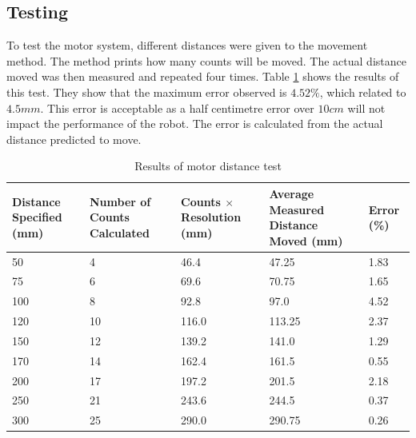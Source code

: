 \subsection{Testing}\label{Section:MotorTest}

To test the motor system, different distances were given to the movement method. The method prints how many counts will be moved. The actual distance moved was then measured and repeated four times. Table \ref{table:results:motor:distance} shows the results of this test. They show that the maximum error observed is $4.52\%$, which related to $4.5mm$. This error is acceptable as a half centimetre error over $10cm$ will not impact the performance of the robot. The error is calculated from the actual distance predicted to move. 


\begin{table}
\caption{Results of motor distance test}
\label{table:results:motor:distance}
\begin{tabular}{p{2.5cm}p{2.5cm}p{2.5cm}p{2.5cm}p{2.5cm}} \toprule
Distance Specified (mm) &	Number of Counts Calculated	& 	Counts $\times$ Resolution (mm)	& 	Average Measured Distance Moved (mm)	&	Error (\%) \\ \toprule
50						&	4							&	46.4							&	47.25									&	1.83		\\ \midrule
75						&	6							&	69.6							&	70.75									&	1.65		\\ \midrule
100						&	8							&	92.8							&	97.0									&	4.52		\\ \midrule
120						&	10							&	116.0							&	113.25									&	2.37		\\ \midrule
150						&	12							&	139.2							&	141.0									&	1.29		\\ \midrule
170						&	14							&	162.4							&	161.5									&	0.55		\\ \midrule
200						&	17							&	197.2							&	201.5									&	2.18		\\ \midrule
250						&	21							&	243.6							&	244.5									&	0.37		\\ \midrule
300						&	25							&	290.0							&	290.75									&	0.26		\\ \bottomrule
\end{tabular}
\end{table}



